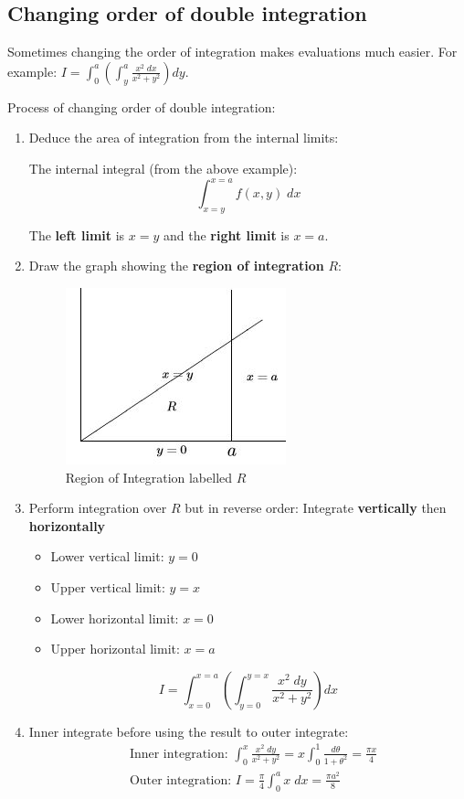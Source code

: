 \documentclass[10pt,a4paper]{article}
\begin{document}
\subsection{Changing order of double integration}

Sometimes changing the order of integration makes evaluations much easier. For example: $I=\int_0^a
\left(\int_y^a \frac{x^2\; dx}{x^2+y^2}\right)dy$. 

Process of changing order of double integration:
\begin{enumerate}
    \item Deduce the area of integration from the internal limits:
    
    The internal integral (from the above example):
    $$
        \int_{x=y}^{x=a}f(x,y)\; dx
    $$

    The \textbf{left limit} is $x=y$ and the \textbf{right limit} is $x=a$.

    \item Draw the graph showing the \textbf{region of integration} $R$:
    \begin{figure} [h!]
        \centering
        \includegraphics[scale=0.75]{R.JPG}
        \caption{Region of Integration labelled $R$}
    \end{figure}

    \item Perform integration over $R$ but in reverse order: Integrate \textbf{vertically} then \textbf{horizontally}
    \begin{itemize}
        \item Lower vertical limit: $y=0$
        \item Upper vertical limit: $y=x$
        \item Lower horizontal limit: $x=0$
        \item Upper horizontal limit: $x=a$
    \end{itemize}
    $$
        I = \int_{x=0}^{x=a} \left(\int_{y=0}^{y=x}\frac{x^2 \; dy}{x^2+y^2}\right) dx
    $$

    \item Inner integrate before using the result to outer integrate:
    \begin{align*}
        &\text{Inner integration: } \int_0^x \frac{x^2\; dy}{x^2+y^2} = x\int_0^1 \frac{d\theta}{1+\theta^2} = \frac{\pi x}{4} \\
        &\text{Outer integration: } I = \frac{\pi}{4}\int_0^a x\; dx = \frac{\pi a^2}{8}
    \end{align*} 
\end{enumerate}
\end{document}
